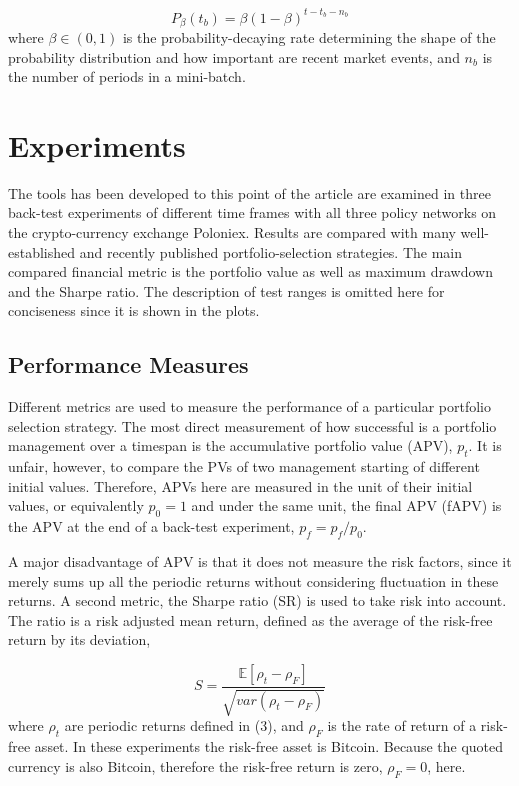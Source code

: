 \documentclass[journal,onecolumn]{IEEEtran}
\begin{document}
\begin{equation}
	P_{\beta}(t_b) = \beta(1 - \beta)^{t-t_b-n_b}
\end{equation}
where $\beta \in (0, 1)$ is the probability-decaying rate determining the shape of the probability distribution and how important are recent market events, and $n_b$ is the number of periods
in a mini-batch.

\section{Experiments}
The tools has been developed to this point of the article are examined in three back-test experiments of different time frames with all three policy networks on the crypto-currency exchange Poloniex. Results are compared with many well-established and recently published
portfolio-selection strategies. The main compared financial metric is the portfolio value as well as maximum drawdown and the Sharpe ratio. The description of test ranges is omitted here for conciseness since it is shown in the plots.

\subsection{Performance Measures}
Different metrics are used to measure the performance of a particular portfolio selection strategy. The most direct measurement of how successful is a portfolio management over a timespan is the accumulative portfolio value (APV), $p_t$. It is unfair, however, to compare the PVs of two management starting of different initial values. Therefore, APVs here are measured in the unit of their initial values, or equivalently $p_0 = 1$ and under the same unit, the final APV (fAPV) is the APV at the end of a back-test experiment, $p_f = p_f /p_0$.

A major disadvantage of APV is that it does not measure the risk factors, since it merely sums up all the periodic returns without considering fluctuation in these returns. A second metric, the Sharpe ratio (SR) \cite{Sharpe1994} is used to take risk into account. The
ratio is a risk adjusted mean return, defined as the average of the risk-free return by its deviation,

\begin{equation}
	S = \frac{\mathbb{E} [\rho_t - \rho_F]}{\sqrt{var (\rho_t - \rho_F)}}
\end{equation}
where $\rho_t$ are periodic returns defined in (3), and $\rho_F$ is the rate of return of a risk-free asset.
In these experiments the risk-free asset is Bitcoin. Because the quoted currency is also Bitcoin, therefore the risk-free return is zero, $\rho_F = 0$, here.
\end{document}
